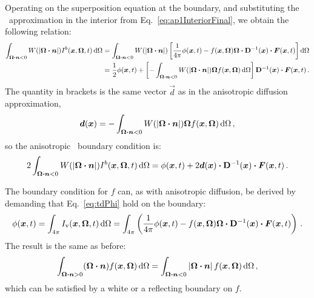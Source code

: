 Operating on the superposition equation at the boundary, and substituting the
\APone\ approximation in the interior from Eq.~\eqref{eq:ap1InteriorFinal}, we
obtain the following relation:
\begin{align*}
  \int_{\bm{\Omega}\bm{\cdot}\bm{n} < 0}
  W(\left| \bm{\Omega}\bm{\cdot}\bm{n} \right|) I^b(\bm{x},\bm{\Omega},t) \mathop{}\!\mathrm{d}\Omega
 &= 
 \int_{\bm{\Omega}\bm{\cdot}\bm{n} < 0}
  W(\left| \bm{\Omega}\bm{\cdot}\bm{n} \right|) \left[ \frac{1}{4\pi} \phi(\bm{x},t)
  - f(\bm{x},\bm{\Omega}) \bm{\Omega} \bm{\cdot}
  \mathbf{D}^{-1}(\bm{x}) \bm{\cdot} \bm{F}(\bm{x},t)\right] \mathop{}\!\mathrm{d}\Omega
\\
&= \frac{1}{2} \phi(\bm{x},t)
+  \left[ - \int_{\bm{\Omega}\bm{\cdot}\bm{n} < 0} W(\left| \bm{\Omega}\bm{\cdot}\bm{n} \right|)
  \bm{\Omega} f(\bm{x},\bm{\Omega}) \mathop{}\!\mathrm{d}\Omega\right]
 \mathbf{D}^{-1}(\bm{x}) \bm{\cdot} \bm{F}(\bm{x},t) \,.
\end{align*}
The quantity in brackets is the same vector $\vec{d}$ as in the anisotropic
diffusion approximation,
\begin{equation} \tagref{eq:adBoundaryIntegral2}
  \vec{d}(\vec{x}) = -\int_{\vec{\Omega}\vd\vec{n} < 0} W(\abs{\vec{\Omega}\vd\vec{n}})
\vec{\Omega} f(\vec{x}, \vec{\Omega}) \ud\Omega\,,
\end{equation}
so the anisotropic \Pone\ boundary condition is:
\begin{equation} \label{eq:ap1BoundaryCondition}
  2 \int_{\bm{\Omega}\bm{\cdot}\bm{n} < 0}
  W(\left| \bm{\Omega}\bm{\cdot}\bm{n} \right|) I^b(\bm{x},\bm{\Omega},t) \mathop{}\!\mathrm{d}\Omega
  = \phi(\bm{x},t)
  + 2 \bm{d}(\bm{x}) \bm{\cdot} \mathbf{D}^{-1}(\bm{x}) \bm{\cdot} \bm{F}(\bm{x},t) \,.
\end{equation}

The boundary condition for $f$ can, as with anisotropic diffusion, be derived by
demanding that Eq.~\eqref{eq:tdPhi} hold on the boundary:
\begin{equation*}
 \phi(\bm{x},t)
 = \int_{4\pi} I_\mathrm{v}(\bm{x},\bm{\Omega},t) \mathop{}\!\mathrm{d} \Omega
 = \int_{4\pi}  \left( 
\frac{1}{4\pi} \phi(\bm{x},t)
 - f(\bm{x},\bm{\Omega}) \bm{\Omega} \bm{\cdot}
  \mathbf{D}^{-1}(\bm{x}) \bm{\cdot} \bm{F}(\bm{x},t)
 \right) \,.
\end{equation*}
The result is the same as before:
\begin{equation}\tagref{eq:hoBc}
  \int_{\vec{\Omega}\vd\vec{n} > 0} (\vec{\Omega}\vd \vec{n})
  f(\vec{x}, \vec{\Omega}) \ud\Omega
  =
  \int_{\vec{\Omega}\vd\vec{n} < 0} \abs{\vec{\Omega}\vd \vec{n}}
  f(\vec{x}, \vec{\Omega}) \ud\Omega \,,
\end{equation}
which can be satisfied by a white or a reflecting boundary on $f$.

